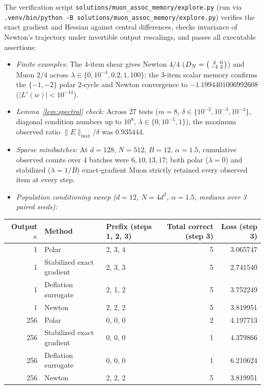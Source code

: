 \documentclass[11pt]{article}
\theoremstyle{plain}
\theoremstyle{definition}
\theoremstyle{remark}
\begin{document}
The verification script \texttt{solutions/muon\_assoc\_memory/explore.py} (run via \texttt{.venv/bin/python -B solutions/muon\_assoc\_memory/explore.py}) verifies the exact gradient and Hessian against central differences, checks invariance of Newton's trajectory under invertible output rescalings, and passes all executable assertions:
\begin{itemize}[leftmargin=2em,itemsep=2pt]
\item \emph{Finite examples:} The 4-item shear gives Newton $4/4$ ($D_N = \begin{psmallmatrix}2 & 0\\-4 & 2\end{psmallmatrix}$) and Muon $2/4$ across $\lambda \in \{0, 10^{-4}, 0.2, 1, 100\}$; the 3-item scalar memory confirms the $\{-1, -2\}$ polar $2$-cycle and Newton convergence to $-1.1994401006992608$ ($|L'(w)| < 10^{-14}$).
\item \emph{Lemma~\ref{lem:spectral} check:} Across 27 tests ($m = 8$, $\delta \in \{10^{-2}, 10^{-3}, 10^{-4}\}$, diagonal condition numbers up to $10^8$, $\lambda \in \{0, 10^{-5}, 1\}$), the maximum observed ratio $\|E\|_{\max}/\delta$ was $0.935444$.
\item \emph{Sparse minibatches:} At $d = 128$, $N = 512$, $B = 12$, $\alpha = 1.5$, cumulative observed counts over 4 batches were $6, 10, 13, 17$; both polar ($\lambda = 0$) and stabilized ($\lambda = 1/B$) exact-gradient Muon strictly retained every observed item at every step.
\item \emph{Population conditioning sweep ($d = 12$, $N = 4d^2$, $\alpha = 1.5$, medians over 3 paired seeds):}
\end{itemize}

\begin{table}[h!]
\centering
\small
\begin{tabular}{@{}rllrr@{}}
\toprule
Output $\kappa$ & Method & Prefix (steps 1, 2, 3) & Total correct (step 3) & Loss (step 3) \\
\midrule
1   & Polar                      & 2, 3, 4 & 5 & 3.065747 \\
1   & Stabilized exact gradient  & 2, 3, 3 & 5 & 2.741540 \\
1   & Deflation surrogate        & 2, 1, 2 & 5 & 3.752249 \\
1   & Newton                     & 2, 2, 2 & 5 & 3.819951 \\
256 & Polar                      & 0, 0, 0 & 2 & 4.197713 \\
256 & Stabilized exact gradient  & 0, 0, 0 & 1 & 4.379866 \\
256 & Deflation surrogate        & 0, 0, 0 & 1 & 6.210624 \\
256 & Newton                     & 2, 2, 2 & 5 & 3.819951 \\
\bottomrule
\end{tabular}
\end{table}
\end{document}
